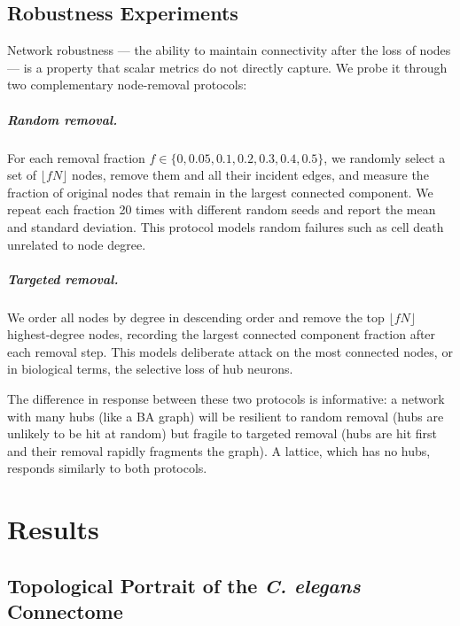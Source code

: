 \documentclass[12pt,a4paper]{report}
\begin{document}
\section{Robustness Experiments}

Network robustness — the ability to maintain connectivity after the loss of nodes — is a property that scalar metrics do not directly capture. We probe it through two complementary node-removal protocols:

\paragraph{Random removal.} For each removal fraction $f \in \{0, 0.05, 0.1, 0.2, 0.3, 0.4, 0.5\}$, we randomly select a set of $\lfloor fN \rfloor$ nodes, remove them and all their incident edges, and measure the fraction of original nodes that remain in the largest connected component. We repeat each fraction 20 times with different random seeds and report the mean and standard deviation. This protocol models random failures such as cell death unrelated to node degree.

\paragraph{Targeted removal.} We order all nodes by degree in descending order and remove the top $\lfloor fN \rfloor$ highest-degree nodes, recording the largest connected component fraction after each removal step. This models deliberate attack on the most connected nodes, or in biological terms, the selective loss of hub neurons.

The difference in response between these two protocols is informative: a network with many hubs (like a BA graph) will be resilient to random removal (hubs are unlikely to be hit at random) but fragile to targeted removal (hubs are hit first and their removal rapidly fragments the graph). A lattice, which has no hubs, responds similarly to both protocols.

\chapter{Results}

\section{Topological Portrait of the \textit{C. elegans} Connectome}
\end{document}

